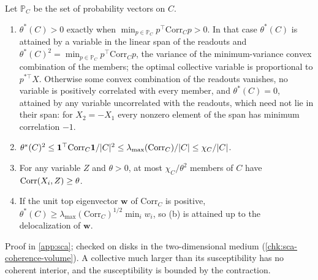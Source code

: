 \begin{theorem}\label{thm:sca-coherence-volume}
Let $\mathbb P_C$ be the set of probability vectors on $C$.
\begin{enumerate}
\item[(a)] $\theta^\ast(C)>0$ exactly when $\min_{p\in\mathbb P_C}p^\top\mathrm{Corr}_Cp>0$. In that case $\theta^\ast(C)$ is attained by a variable in the linear span of the readouts and $\theta^\ast(C)^2=\min_{p\in\mathbb P_C}p^\top\mathrm{Corr}_Cp$, the variance of the minimum-variance convex combination of the members; the optimal collective variable is proportional to $p^{\ast\top}X$. Otherwise some convex combination of the readouts vanishes, no variable is positively correlated with every member, and $\theta^\ast(C)=0$, attained by any variable uncorrelated with the readouts, which need not lie in their span: for $X_2=-X_1$ every nonzero element of the span has minimum correlation $-1$.
\item[(b)] $\theta^\ast(C)^2\le\mathbf{1}^\top\mathrm{Corr}_C\mathbf{1}/|C|^2\le\lambda_{\max}(\mathrm{Corr}_C)/|C|\le\chi_C/|C|$.
\item[(c)] For any variable $Z$ and $\theta>0$, at most $\chi_C/\theta^2$ members of $C$ have $\operatorname{Corr}(X_i,Z)\ge\theta$.
\item[(d)] If the unit top eigenvector $\mathbf w$ of $\mathrm{Corr}_C$ is positive, $\theta^\ast(C)\ge\lambda_{\max}(\mathrm{Corr}_C)^{1/2}\min_iw_i$, so (b) is attained up to the delocalization of $\mathbf w$.
\end{enumerate}
\end{theorem}
Proof in \cref{app:sca}; checked on disks in the two-dimensional medium (\cref{chk:sca-coherence-volume}). A collective much larger than its susceptibility has no coherent interior, and the susceptibility is bounded by the contraction.


